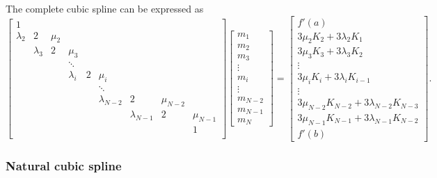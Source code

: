 \documentclass[a4paper]{article}
\theoremstyle{definition}
\begin{document}
The complete cubic spline can be expressed as
\begin{equation}
  \begin{bmatrix}
    1 &  &  &  &  &  &  &  & \\
    \lambda_2 & 2 & \mu_2 &  &  &  &  &  & \\
    & \lambda_3 & 2 & \mu_3 &  &  &  &  & \\
    &   &   & \ddots &  &  &  &  & \\
    &   &   & \lambda_i & 2 & \mu_i &  &  & \\
    &   &   &   &   & \ddots &  &  & \\
    &   &   &   &   & \lambda_{N - 2} & 2 & \mu_{N - 2} & \\
    &   &   &   &   &   & \lambda_{N - 1} & 2 & \mu_{N - 1} \\
    &   &   &   &   &   &   &   & 1 \\
  \end{bmatrix}
  \begin{bmatrix}
    m_1 \\ m_2 \\ m_3 \\ \vdots \\ m_i \\ \vdots \\ m_{N - 2} \\ m_{N - 1} \\ m_N
  \end{bmatrix}
  = \begin{bmatrix}
    f'(a) \\
    3\mu_2 K_2 + 3\lambda_2 K_1 \\
    3\mu_3 K_3 + 3\lambda_3 K_2 \\
    \vdots \\
    3\mu_i K_i + 3\lambda_i K_{i - 1} \\
    \vdots \\
    3\mu_{N - 2} K_{N - 2} + 3\lambda_{N - 2} K_{N - 3} \\
    3\mu_{N - 1} K_{N - 1} + 3\lambda_{N - 1} K_{N - 2} \\
    f'(b)
    \end{bmatrix}.
  \label{eq:pp-form-spline-linear-system-complete}
\end{equation}

\subsubsection{Natural cubic spline}
\end{document}
